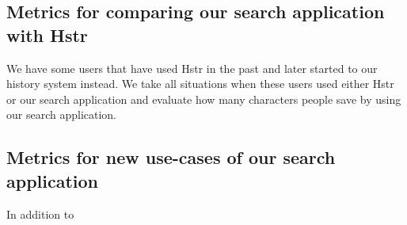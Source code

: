 \subsection{Metrics for comparing our search application with Hstr}

We have some users that have used Hstr \cite{toolshstr} in the past and later started to our history system instead. 
We take all situations when these users used either Hstr or our search application and evaluate how many characters people save by using our search application.




\subsection{Metrics for new use-cases of our search application}

In addition to 